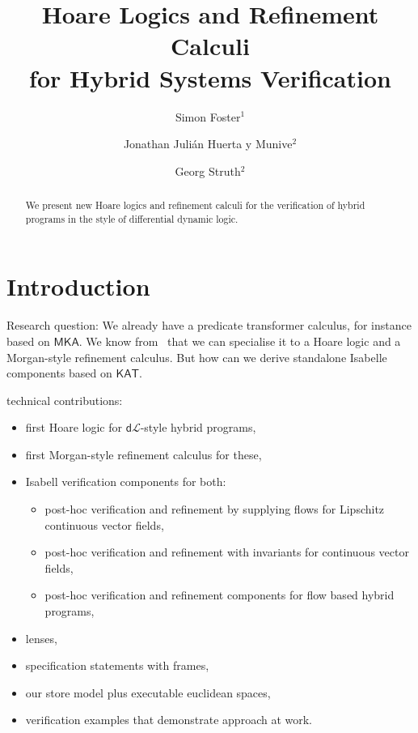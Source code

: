 \documentclass[envcountsame]{llncs}
\newcommand{\MKA}{\mathsf{MKA}}
\newcommand{\KAT}{\mathsf{KAT}}
\newcommand{\dL}{\mathsf{d}\mathcal{L}}
\begin{document}
\title{Hoare Logics and Refinement Calculi\\ for Hybrid Systems Verification} 

\author{Simon Foster$^1$ \and Jonathan Juli\'an Huerta y Munive$^2$ \and Georg Struth$^2$} 


\maketitle

\begin{abstract} 
  We present new Hoare logics and refinement calculi for the
  verification of hybrid programs in the style of differential dynamic
  logic.
\end{abstract}




\section{Introduction}\label{sec:introduction}

Research question: We already have a predicate transformer calculus,
for instance based on $\MKA$. We know from~\cite{GomesS16} that we can
specialise it to a Hoare logic and a Morgan-style refinement
calculus. But how can we derive standalone Isabelle components based
on $\KAT$. 

technical contributions:
\begin{itemize}
\item first Hoare logic for $\dL$-style hybrid programs,
\item first Morgan-style refinement calculus for these,
\item Isabell verification components for both:
  \begin{itemize}
  \item post-hoc verification and refinement by supplying flows for
    Lipschitz continuous vector fields,
\item post-hoc verification and refinement with invariants for continuous vector
  fields,
\item post-hoc verification and refinement components for flow based
  hybrid programs,
  \end{itemize}
\item lenses,
\item specification statements with frames,
\item our store model plus executable euclidean spaces,
\item verification examples that demonstrate approach at work.
\end{itemize}
\end{document}
